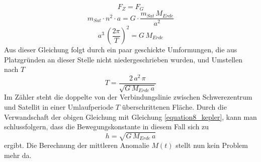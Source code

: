 \begin{equation}
	F_{Z}=F_{G}
\end{equation}     
\begin{equation}
	m_{Sat}\cdot n^2 \cdot a= G \cdot \frac{m_{Sat}\,M_{Erde}}{a^2}
\end{equation} 
\begin{equation}
	 a^3\,\left(\frac{2\pi}{T}\right)^2= G\,M_{Erde}
\end{equation}     
Aus dieser Gleichung folgt durch ein paar geschickte Umformungen, die aus Platzgründen an dieser Stelle nicht niedergeschrieben wurden, und Umstellen nach \ensuremath{T}
\begin{equation}
	T=\frac{2\,a^2\,\pi}{\sqrt{G\,M_{Erde}\,a}}
\end{equation}
Im Zähler steht die doppelte von der Verbindungslinie zwischen Schwerezentrum und Satellit in einer Umlaufperiode \ensuremath{T} überschrittenen Fläche. Durch die Verwandschaft der obigen Gleichung mit Gleichung \ref{equation8_kepler}, kann man schlussfolgern, dass die Bewegungskonstante in diesem Fall sich zu 
\begin{equation}
	h=\sqrt{G\,M_{Erde}\,a}
\end{equation}   
ergibt. Die Berechnung der mittleren Anomalie \ensuremath{M(t)} stellt nun kein Problem mehr da.
